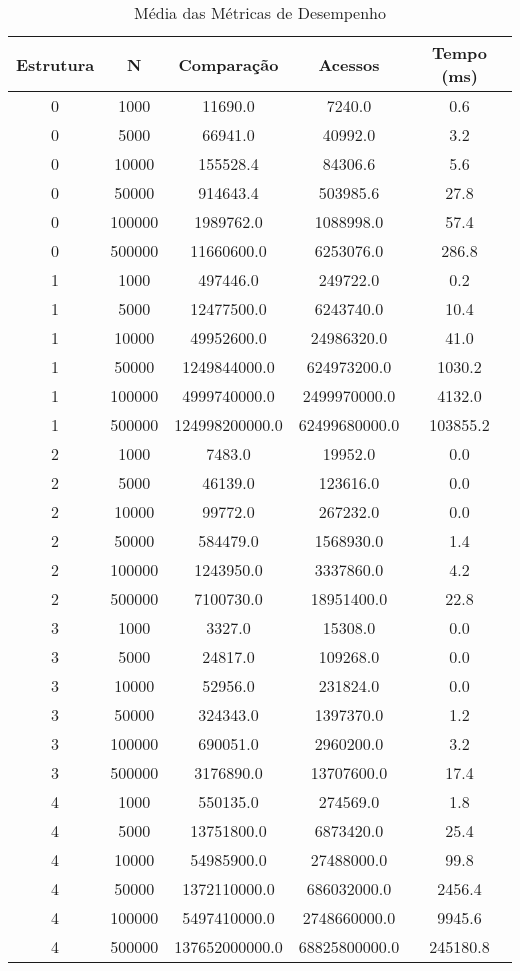 \begin{table}[htbp]
\caption{Média das Métricas de Desempenho}
\label{tab:table1}
\begin{tabular}{c|c|c|c|c}
\textbf{Estrutura} & \textbf{N} & \textbf{Comparação} & \textbf{Acessos} & \textbf{Tempo (ms)}\\
\hline
0 & 1000 & 11690.0 & 7240.0 & 0.6\\
0 & 5000 & 66941.0 & 40992.0 & 3.2\\
0 & 10000 & 155528.4 & 84306.6 & 5.6\\
0 & 50000 & 914643.4 & 503985.6 & 27.8\\
0 & 100000 & 1989762.0 & 1088998.0 & 57.4\\
0 & 500000 & 11660600.0 & 6253076.0 & 286.8\\
1 & 1000 & 497446.0 & 249722.0 & 0.2\\
1 & 5000 & 12477500.0 & 6243740.0 & 10.4\\
1 & 10000 & 49952600.0 & 24986320.0 & 41.0\\
1 & 50000 & 1249844000.0 & 624973200.0 & 1030.2\\
1 & 100000 & 4999740000.0 & 2499970000.0 & 4132.0\\
1 & 500000 & 124998200000.0 & 62499680000.0 & 103855.2\\
2 & 1000 & 7483.0 & 19952.0 & 0.0\\
2 & 5000 & 46139.0 & 123616.0 & 0.0\\
2 & 10000 & 99772.0 & 267232.0 & 0.0\\
2 & 50000 & 584479.0 & 1568930.0 & 1.4\\
2 & 100000 & 1243950.0 & 3337860.0 & 4.2\\
2 & 500000 & 7100730.0 & 18951400.0 & 22.8\\
3 & 1000 & 3327.0 & 15308.0 & 0.0\\
3 & 5000 & 24817.0 & 109268.0 & 0.0\\
3 & 10000 & 52956.0 & 231824.0 & 0.0\\
3 & 50000 & 324343.0 & 1397370.0 & 1.2\\
3 & 100000 & 690051.0 & 2960200.0 & 3.2\\
3 & 500000 & 3176890.0 & 13707600.0 & 17.4\\
4 & 1000 & 550135.0 & 274569.0 & 1.8\\
4 & 5000 & 13751800.0 & 6873420.0 & 25.4\\
4 & 10000 & 54985900.0 & 27488000.0 & 99.8\\
4 & 50000 & 1372110000.0 & 686032000.0 & 2456.4\\
4 & 100000 & 5497410000.0 & 2748660000.0 & 9945.6\\
4 & 500000 & 137652000000.0 & 68825800000.0 & 245180.8\\
\end{tabular}
\end{table}
